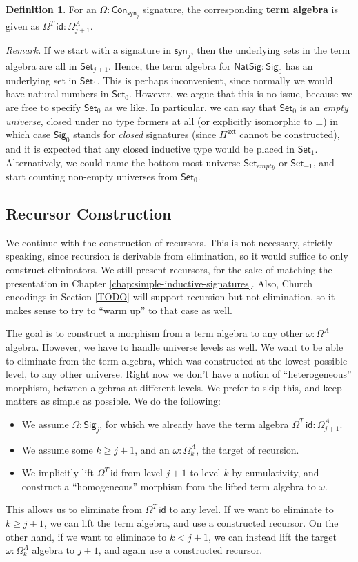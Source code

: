 \documentclass[12pt,a4paper,twoside,openany]{book}
\theoremstyle{remark}
\theoremstyle{definition}
\newtheorem{mydefinition}{Definition}
\theoremstyle{theorem}
\newcommand{\id}{\mathsf{id}}
\newcommand{\Con}{\mathsf{Con}}
\newcommand{\Set}{\mathsf{Set}}
\newcommand{\Pie}{\Pi^{\mathsf{ext}}}
\newcommand{\Sig}{\mathsf{Sig}}
\newcommand{\NatSig}{\mathsf{NatSig}}
\newcommand{\syn}{\mathsf{syn}}
\begin{document}
\begin{mydefinition}
For an $\Omega : \Con_{\syn_j}$ signature, the corresponding \textbf{term
algebra} is given as $\Omega^T\,\id : \Omega^A_{j+1}$.
\end{mydefinition}

\emph{Remark.} If we start with a signature in $\syn_j$, then the underlying
sets in the term algebra are all in $\Set_{j+1}$. Hence, the term algebra for
$\NatSig : \Sig_0$ has an underlying set in $\Set_1$. This is perhaps
inconvenient, since normally we would have natural numbers in $\Set_0$. However,
we argue that this is no issue, because we are free to specify $\Set_0$ as we
like. In particular, we can say that $\Set_0$ is an \emph{empty universe},
closed under no type formers at all (or explicitly isomorphic to $\bot$) in
which case $\Sig_0$ stands for \emph{closed} signatures (since $\Pie$ cannot be
constructed), and it is expected that any closed inductive type would be placed
in $\Set_1$. Alternatively, we could name the bottom-most universe
$\Set_{empty}$ or $\Set_{-1}$, and start counting non-empty universes from
$\Set_0$.

\subsection{Recursor Construction}

We continue with the construction of recursors. This is not necessary, strictly
speaking, since recursion is derivable from elimination, so it would suffice to
only construct eliminators. We still present recursors, for the sake of matching
the presentation in Chapter \ref{chap:simple-inductive-signatures}. Also, Church
encodings in Section \ref{TODO} will support recursion but not elimination, so
it makes sense to try to ``warm up'' to that case as well.

The goal is to construct a morphism from a term algebra to any other $\omega
: \Omega^A$ algebra. However, we have to handle universe levels as well. We want
to be able to eliminate from the term algebra, which was constructed at the
lowest possible level, to any other universe. Right now we don't have a notion
of ``heterogeneous'' morphism, between algebras at different levels.  We prefer
to skip this, and keep matters as simple as possible. We do the following:
\begin{itemize}
  \item We assume $\Omega : \Sig_j$, for which we already have the term algebra $\Omega^T\,\id : \Omega^A_{j+1}$.
  \item We assume some $k \geq j + 1$, and an $\omega : \Omega^A_{k}$, the target of recursion.
  \item We implicitly lift $\Omega^T\,\id$ from level $j + 1$ to level $k$ by cumulativity, and construct
        a ``homogeneous'' morphism from the lifted term algebra to $\omega$.
\end{itemize}
This allows us to eliminate from $\Omega^T\,\id$ to any level. If we want to
eliminate to $k \geq j + 1$, we can lift the term algebra, and use a constructed
recursor. On the other hand, if we want to eliminate to $k < j + 1$, we can
instead lift the target $\omega : \Omega^A_{k}$ algebra to $j + 1$, and again
use a constructed recursor.
\end{document}

